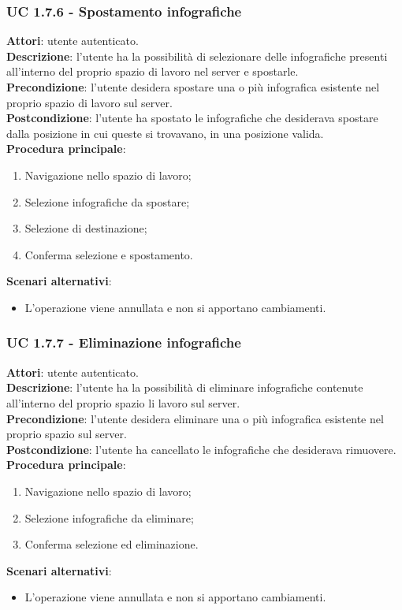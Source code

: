 	\subsubsection{UC 1.7.6 - Spostamento infografiche}{
		\label{uc1.7.6}
		\textbf{Attori}: utente autenticato.	\\
		\textbf{Descrizione}: l'utente ha la possibilità di selezionare delle infografiche presenti all'interno del proprio spazio di lavoro nel server e spostarle. \\
		\textbf{Precondizione}: l'utente desidera spostare una o più infografica esistente nel proprio spazio di lavoro sul server.	\\
		\textbf{Postcondizione}: l'utente ha spostato le infografiche che desiderava spostare dalla posizione in cui queste si trovavano, in una posizione valida.	\\
		\textbf{Procedura principale}:
		\begin{enumerate}
			\item Navigazione nello spazio di lavoro;
			\item Selezione infografiche da spostare;
			\item Selezione di destinazione;
			\item Conferma selezione e spostamento.
		\end{enumerate}
		\textbf{Scenari alternativi}: 
		\begin{itemize}
			\item L'operazione viene annullata e non si apportano cambiamenti.
		\end{itemize}
		}
	\subsubsection{UC 1.7.7 - Eliminazione infografiche}{
		\label{uc1.7.7}
		\textbf{Attori}: utente autenticato.	\\
		\textbf{Descrizione}: l'utente ha la possibilità di eliminare infografiche contenute all'interno del proprio spazio li lavoro sul server. \\
		\textbf{Precondizione}: l'utente desidera eliminare una o più infografica esistente nel proprio spazio sul server.	\\
		\textbf{Postcondizione}: l'utente ha cancellato le infografiche che desiderava rimuovere.	\\
		\textbf{Procedura principale}:
		\begin{enumerate}
			\item Navigazione nello spazio di lavoro;
			\item Selezione infografiche da eliminare;
			\item Conferma selezione ed eliminazione.
		\end{enumerate}
		\textbf{Scenari alternativi}: 
		\begin{itemize}
			\item L'operazione viene annullata e non si apportano cambiamenti.
		\end{itemize}
		}
